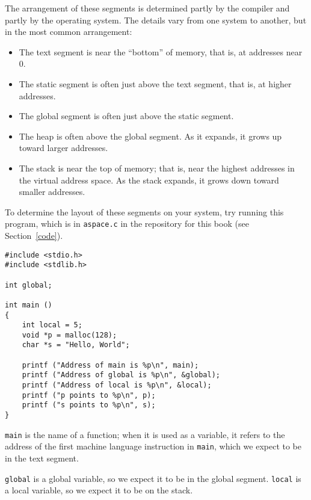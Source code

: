 \documentclass[12pt]{book}
\begin{document}
The arrangement of these segments is determined partly by the 
compiler and partly by the operating system.  The details vary
from one system to another, but in the most common arrangement:

\begin{itemize}

\item The text segment is near the ``bottom'' of memory, that is,
  at addresses near 0.

\item The static segment is often just above the text segment, that is,
at higher addresses.

\item The global segment is often just above the static segment.

\item The heap is often above the global segment.  As it expands,
  it grows up toward larger addresses.
  
\item The stack is near the top of memory; that is, near the
  highest addresses in the virtual address space.  As the
  stack expands, it grows down toward smaller addresses.

\end{itemize}


To determine the layout of these segments on your system, try running
this program, which is in {\tt aspace.c} in the repository for this
book (see Section~\ref{code}).

\begin{verbatim}
#include <stdio.h>
#include <stdlib.h>

int global;

int main ()
{
    int local = 5;
    void *p = malloc(128);
    char *s = "Hello, World";

    printf ("Address of main is %p\n", main);
    printf ("Address of global is %p\n", &global);
    printf ("Address of local is %p\n", &local);
    printf ("p points to %p\n", p);
    printf ("s points to %p\n", s);
}
\end{verbatim}

{\tt main} is the name of a function; when it is used as a variable,
it refers to the address of the first machine language instruction
in {\tt main}, which we expect to be in the text segment.

{\tt global} is a global variable, so we expect it to be in the
global segment.  {\tt local} is a local variable, so we expect it
to be on the stack.
\end{document}
